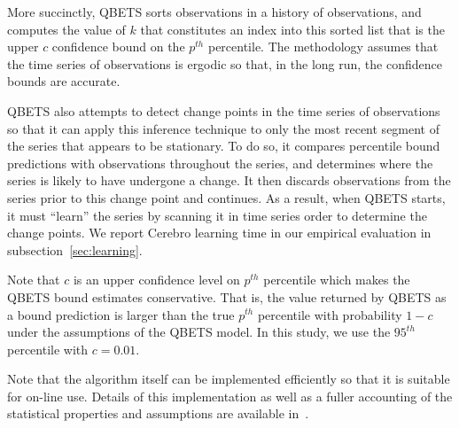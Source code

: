 More succinctly, QBETS sorts observations in a history of observations,
and computes the value of $k$ that constitutes an index into 
this sorted list that is the upper $c$ confidence bound on
the $p^{th}$ percentile. The methodology assumes that the time series of 
observations is ergodic so that, in the long run, the confidence bounds are accurate.  

QBETS also attempts to detect change points in the time series of observations 
so that it can apply this inference technique to only the most recent 
segment of the series that appears to be stationary.  
To do so, it compares
percentile bound predictions with observations throughout the series, and
determines where the series is likely to have undergone a change.  It then
discards observations from the series prior to this change point and
continues.  As a result, when QBETS starts, it must ``learn'' the series by
scanning it in time series order to determine the change points.  We report
Cerebro learning time in our empirical evaluation in
subsection~\ref{sec:learning}.


Note that $c$ is an upper confidence level on $p^{th}$ percentile
which makes the QBETS
bound estimates conservative.  That is, the value returned by QBETS as a bound
prediction is larger than the true $p^{th}$ percentile with probability $1-c$
under the assumptions of the QBETS model. 
In this study, we use the $95^{th}$ percentile with $c = 0.01$.

Note that the algorithm itself can be implemented efficiently so that it is
suitable for on-line use.  Details of this implementation as well as a fuller
accounting of the statistical properties and assumptions are available
in~\cite{Nurmi:2007:QQB:1791551.1791556,uptime-bootstrap,quant-est,ckpt-sched}.



